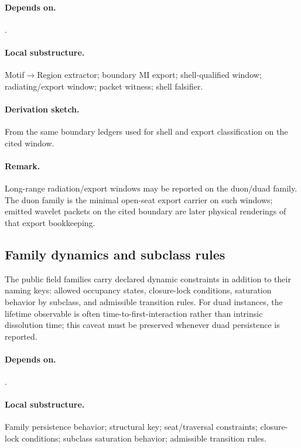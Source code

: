 \paragraph{Depends on.} .
\paragraph{Local substructure.} Motif$\to$Region extractor; boundary MI export; shell-qualified window; radiating/export window; packet witness; shell falsifier.
\paragraph{Derivation sketch.} From the same boundary ledgers used for shell and export classification on the cited window.
\paragraph{Remark.} Long-range radiation/export windows may be reported on the duon/duad family. The duon family is the minimal open-seat export carrier on such windows; emitted wavelet packets on the cited boundary are later physical renderings of that export bookkeeping.

\subsection{Family dynamics and subclass rules}\label{subsec:family-dynamics-subclass}
\begin{definition}
\label{def:family-dynamics-operator}
The public field families carry declared dynamic constraints in addition to their naming keys: allowed occupancy states, closure-lock conditions, saturation behavior by subclass, and admissible transition rules. For duad instances, the lifetime observable is often time-to-first-interaction rather than intrinsic dissolution time; this caveat must be preserved whenever duad persistence is reported.
\end{definition}

\paragraph{Depends on.} .
\paragraph{Local substructure.} Family persistence behavior; structural key; seat/traversal constraints; closure-lock conditions; subclass saturation behavior; admissible transition rules.
